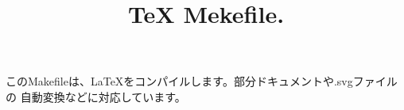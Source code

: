 \documentclass[]{article}
\begin{document}
\title{{\TeX} Mekefile.}

\maketitle

このMakefileは、\LaTeX をコンパイルします。部分ドキュメントや.svgファイルの
自動変換などに対応しています。



\end{document}
